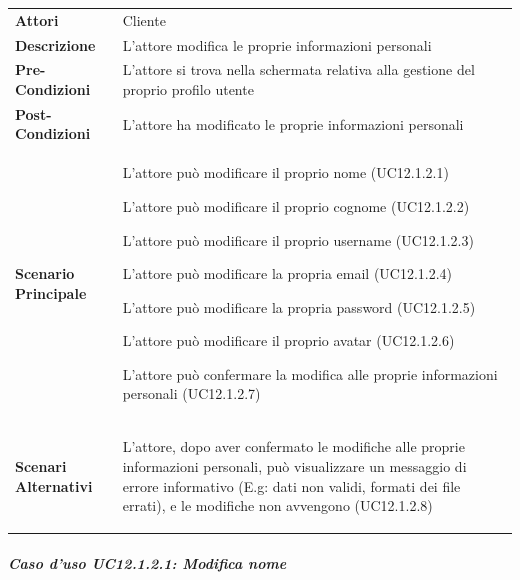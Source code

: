 \begin{tabular}{ l | p{11cm}}
	\hline
	\rowcolor{Gray}
	\multicolumn{2}{c}{UC12.1.2 - Modifica informazioni personali} \\
	\hline
	\textbf{Attori} & Cliente \\
	\textbf{Descrizione} & L'attore modifica le proprie informazioni personali \\
	\textbf{Pre-Condizioni} & L'attore si trova nella schermata relativa alla gestione del proprio profilo utente \\
	\textbf{Post-Condizioni} & L'attore ha modificato le proprie informazioni personali \\
	\textbf{Scenario Principale} & 
	\begin{enumerate*}[label=(\arabic*.),itemjoin={\newline}]
		\item L'attore può modificare il proprio nome (UC12.1.2.1)
		\item L'attore può modificare il proprio cognome (UC12.1.2.2)
		\item L'attore può modificare il proprio username (UC12.1.2.3)
		\item L'attore può modificare la propria email (UC12.1.2.4)
		\item L'attore può modificare la propria password (UC12.1.2.5)
		\item L'attore può modificare il proprio avatar (UC12.1.2.6)
		\item L'attore può confermare la modifica alle proprie informazioni personali (UC12.1.2.7)
	\end{enumerate*}\\
	\textbf{Scenari Alternativi} & 
	\begin{enumerate*}[label=(\arabic*.),itemjoin={\newline}]
		\item L'attore, dopo aver confermato le modifiche alle proprie informazioni personali, può visualizzare un messaggio di errore informativo (E.g: dati non validi, formati dei file errati), e le modifiche non avvengono (UC12.1.2.8)
	\end{enumerate*}\\
\end{tabular}

\subparagraph{Caso d'uso UC12.1.2.1: Modifica nome}
\label{UC12_1_2_1}

